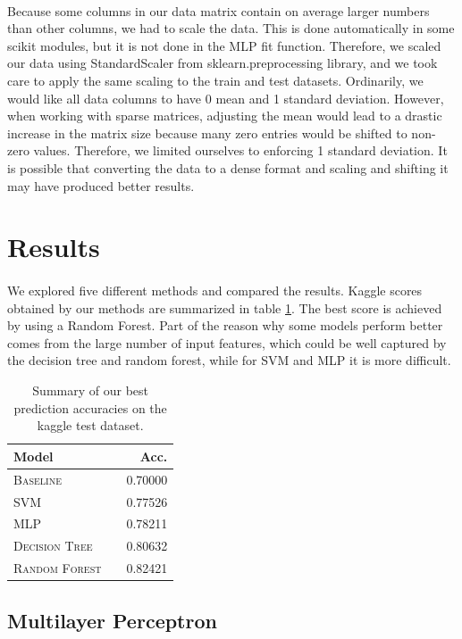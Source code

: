\documentclass[11pt]{article}
\begin{document}
\paragraph{} Because some columns in our data matrix contain on average larger numbers than other columns, we had to scale the data. This is done automatically in some scikit modules, but it is not done in the MLP fit function. Therefore, we scaled our data using StandardScaler from sklearn.preprocessing library, and we took care to apply the same scaling to the train and test datasets. Ordinarily, we would like all data columns to have 0 mean and 1 standard deviation. However, when working with sparse matrices, adjusting the mean would lead to a drastic increase in the matrix size because many zero entries would be shifted to non-zero values. Therefore, we limited ourselves to enforcing 1 standard deviation. It is possible that converting the data to a dense format and scaling and shifting it may have produced better results. 
\section{Results}
\paragraph{} We explored five different methods and compared the results. Kaggle scores obtained by our methods are summarized in table \ref{tab:results}. The best score is achieved by using a Random Forest. Part of the reason why some models perform better comes from the large number of input features, which could be well captured by the decision tree and random forest, while for SVM and MLP it is more difficult.
  \begin{table}
\centering
\begin{tabular}{llr}
 \toprule
 Model &  & Acc. \\
 \midrule
 \textsc{Baseline} & & 0.70000\\
 \textsc{SVM} & & 0.77526 \\
 \textsc{MLP} & & 0.78211 \\
 \textsc{Decision Tree} & & 0.80632\\
  \textsc{Random Forest} & &0.82421\\
 \bottomrule
\end{tabular}
\caption{\label{tab:results} Summary of our best prediction accuracies on the kaggle test dataset.}
\end{table}
\subsection{Multilayer Perceptron}
\end{document}
